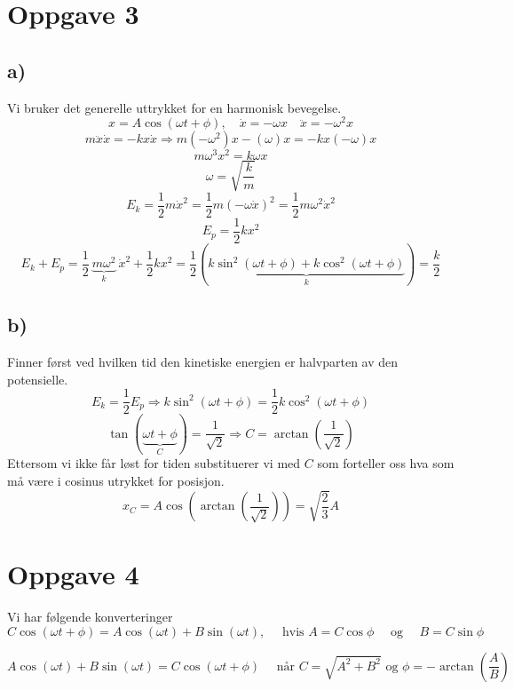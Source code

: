 \documentclass{article}
\begin{document}
\newpage
\section*{Oppgave 3}
  
\subsection*{a)}
  
Vi bruker det generelle uttrykket for en harmonisk bevegelse. 
\[
x = A \cos(ωt + ϕ), \quad \dot{x} = -ωx \quad \ddot{x} = -ω^{2}x
\]
\[
  m\ddot{x}\dot{x} = -  kx \dot{x} ⇒ m (-ω^{2})x -(ω)x = -kx (-ω)x
\]
\[
mω^{3} x^{2} = kωx
\]
\[
ω = \sqrt{\frac{k}{m}} 
\]
\[
E_k = \frac{1}{2}m \dot{x}^{2} = \frac{1}{2}m \left( -ω \dot{x} \right) ^{2} = \frac{1}{2}mω^{2}\dot{x}^{2} 
\] 
\[
E_p = \frac{1}{2}kx^{2}
\]
\[
E_k + E_p = \frac{1}{2}\ \underbrace{mω^{2}}_{k}\ \dot{x}^{2} + \frac{1}{2}kx^{2} = \frac{1}{2} \left(\underbrace{k\sin^{2}(ωt + ϕ) + k \cos ^{2}(ωt + ϕ)}_{k} \right) = \frac{k}{2}
\]

\subsection*{b)}
Finner først ved hvilken tid den kinetiske energien er halvparten av den potensielle. 
\[
E_k = \frac{1}{2} E_p ⇒ k \sin ^{2} (ωt + ϕ) = \frac{1}{2} k \cos ^{2} (ωt + ϕ)
\]
\[
\tan (\underbrace{ωt + ϕ}_{C}) = \frac{1}{\sqrt{2}} ⇒ C = \arctan \left( \frac{1}{\sqrt{2}} \right)
\]
Ettersom vi ikke får løst for tiden substituerer vi med $C$ som forteller oss hva som må være i cosinus utrykket for posisjon. 
\[
x_{C} = A \cos \left(\arctan \left( \frac{1}{\sqrt{2}} \right)  \right) = \sqrt{\frac{2}{3}}A
\]


\newpage
\section*{Oppgave 4}
Vi har følgende konverteringer 
\begin{equation}\label{eq: con_1}
  C \cos (ωt + ϕ) = A \cos (ωt) + B \sin (ωt), \quad \text{ hvis } A = C \cos ϕ \quad \text{ og } \quad B = C \sin ϕ
\end{equation}

\begin{equation}\label{eq: con_2}
  A \cos (ωt) + B \sin (ωt) = C \cos (ωt + ϕ) \quad \text{ når } C = \sqrt{A^2 + B^2} \text{ og } ϕ = - \arctan \left( \frac{A}{B} \right) 
\end{equation}
\end{document}
